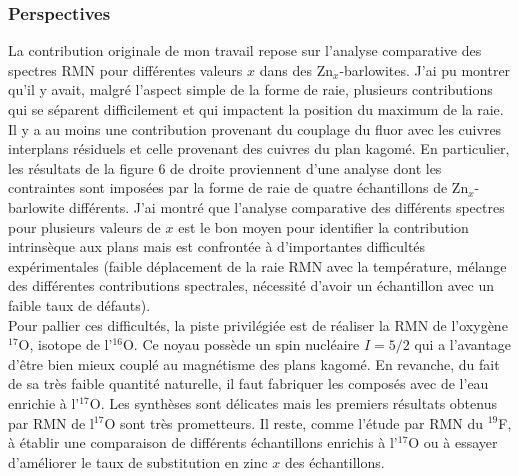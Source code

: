 \subsubsection{Perspectives}
La contribution originale de mon travail repose sur l'analyse comparative des spectres RMN pour différentes valeurs $x$ dans des Zn$_x$-barlowites. J'ai pu montrer qu'il y avait, malgré l'aspect simple de la forme de raie, plusieurs contributions qui se séparent difficilement et qui impactent la position du maximum de la raie. Il y a au moins une contribution provenant du couplage du fluor avec les cuivres interplans résiduels et celle provenant des cuivres du plan kagomé. En particulier, les résultats de la figure 6 de droite proviennent d'une analyse dont les contraintes sont imposées par la forme de raie de quatre échantillons de Zn$_x$-barlowite différents. J'ai montré que l'analyse comparative des différents spectres pour plusieurs valeurs de $x$ est le bon moyen pour identifier la contribution intrinsèque aux plans mais est confrontée à d'importantes difficultés expérimentales (faible déplacement de la raie RMN avec la température, mélange des différentes contributions spectrales,  nécessité d'avoir un échantillon avec un faible taux de défauts).\\

Pour pallier ces difficultés, la piste privilégiée est de réaliser la RMN de l'oxygène $^{17}$O, isotope de l'$^{16}$O. Ce noyau possède un spin nucléaire $I=5/2$ qui a l'avantage d'être bien mieux couplé au magnétisme des plans kagomé. En revanche, du fait de sa très faible quantité naturelle, il faut fabriquer les composés avec de l'eau enrichie à l'$^{17}$O. Les synthèses sont délicates mais les premiers résultats obtenus par RMN de l$^{17}$O sont très prometteurs. Il reste, comme l'étude par RMN du $^{19}$F, à établir une comparaison de différents échantillons enrichis à l'$^{17}$O ou à essayer d'améliorer le taux de substitution en zinc $x$ des échantillons.\\